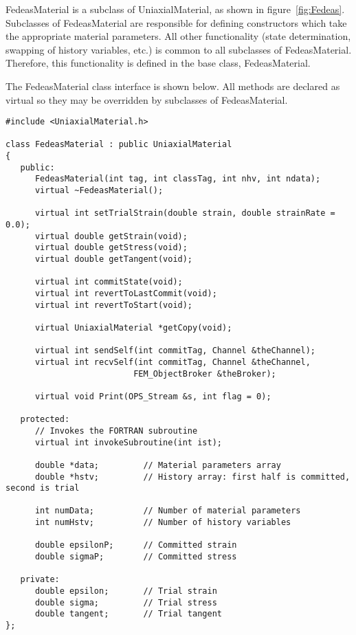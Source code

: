 \documentclass[12pt]{article}
\begin{document}
FedeasMaterial is a subclass of UniaxialMaterial, as shown in figure~\ref{fig:Fedeas}.
Subclasses of FedeasMaterial are responsible for defining constructors which take the
appropriate material parameters. All other functionality (state determination, swapping
of history variables, etc.) is common to all subclasses of FedeasMaterial. Therefore,
this functionality is defined in the base class, FedeasMaterial.

The FedeasMaterial class interface is shown below. All methods are declared as virtual
so they may be overridden by subclasses of FedeasMaterial.

{\sf\small
\begin{verbatim}
#include <UniaxialMaterial.h>

class FedeasMaterial : public UniaxialMaterial
{
   public:
      FedeasMaterial(int tag, int classTag, int nhv, int ndata);
      virtual ~FedeasMaterial();
     
      virtual int setTrialStrain(double strain, double strainRate = 0.0);
      virtual double getStrain(void);
      virtual double getStress(void);
      virtual double getTangent(void);
     
      virtual int commitState(void);
      virtual int revertToLastCommit(void);    
      virtual int revertToStart(void);        
     
      virtual UniaxialMaterial *getCopy(void);
     
      virtual int sendSelf(int commitTag, Channel &theChannel);  
      virtual int recvSelf(int commitTag, Channel &theChannel, 
                          FEM_ObjectBroker &theBroker);    
     
      virtual void Print(OPS_Stream &s, int flag = 0);
     
   protected:
      // Invokes the FORTRAN subroutine
      virtual int invokeSubroutine(int ist);
     
      double *data;         // Material parameters array
      double *hstv;         // History array: first half is committed, second is trial
     
      int numData;          // Number of material parameters
      int numHstv;          // Number of history variables
     
      double epsilonP;      // Committed strain
      double sigmaP;        // Committed stress
     
   private:
      double epsilon;       // Trial strain
      double sigma;         // Trial stress
      double tangent;       // Trial tangent
};
\end{verbatim}
}
\end{document}
